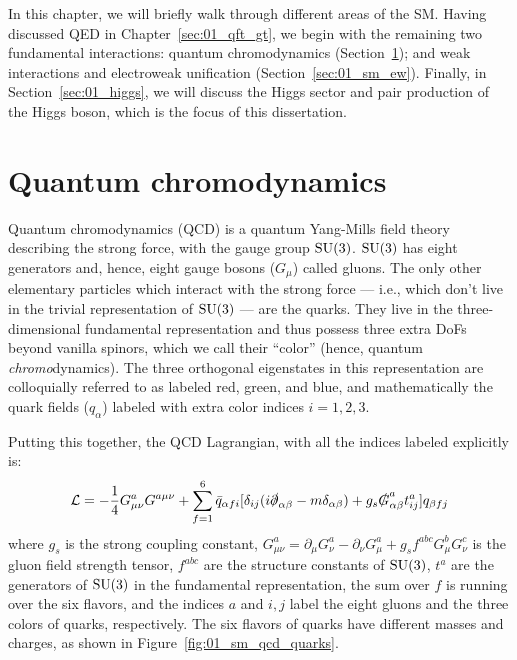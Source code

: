 In this chapter, we will briefly walk through different areas of the SM.
Having discussed QED in Chapter~\ref{sec:01_qft_gt}, we begin with the remaining two fundamental interactions: quantum chromodynamics (Section~\ref{sec:01_sm_qcd}); and weak interactions and electroweak unification (Section~\ref{sec:01_sm_ew}).
Finally, in Section~\ref{sec:01_higgs}, we will discuss the Higgs sector and pair production of the Higgs boson, which is the focus of this dissertation.


\section{Quantum chromodynamics}
\label{sec:01_sm_qcd}

Quantum chromodynamics (QCD) is a quantum Yang-Mills field theory describing the strong force, with the gauge group $\SU[3]$.
$\SU[3]$ has eight generators and, hence, eight gauge bosons ($G_\mu$) called gluons.
The only other elementary particles which interact with the strong force --- i.e., which don't live in the trivial representation of $\SU[3]$ --- are the quarks.
They live in the three-dimensional fundamental representation and thus possess three extra DoFs beyond vanilla spinors, which we call their ``color'' (hence, quantum \textit{chromo}dynamics).
The three orthogonal eigenstates in this representation are colloquially referred to as labeled red, green, and blue, and mathematically the quark fields ($q_\alpha$) labeled with extra color indices $i = 1, 2, 3$.

Putting this together, the QCD Lagrangian, with all the indices labeled explicitly is:
\begin{equation}
	\label{eq:01_sm_qcd_lagrangian}
	\mathcal L = -\frac{1}{4} G^a_{\mu\nu} G^{a\mu\nu} + \sum_{f = 1}^6 \bar q_{\alpha f i} [\delta_{ij}(i\cslashed \partial_{\alpha\beta} - m \delta_{\alpha\beta}) + g_s \cslashed G^a_{\alpha\beta} t_{ij}^a] q_{\beta f j}
\end{equation}
where $g_s$ is the strong coupling constant, $G^a_{\mu\nu} = \partial_\mu G^a_\nu - \partial_\nu G^a_\mu + g_s f^{abc} G^b_\mu G^c_\nu$ is the gluon field strength tensor, $f^{abc}$ are the structure constants of $\SU[3]$, $t^a$ are the generators of $\SU[3]$ in the fundamental representation, the sum over $f$ is running over the six flavors, and the indices $a$ and $i, j$ label the eight gluons and the three colors of quarks, respectively.
The six flavors of quarks have different masses and charges, as shown in Figure~\ref{fig:01_sm_qcd_quarks}.

